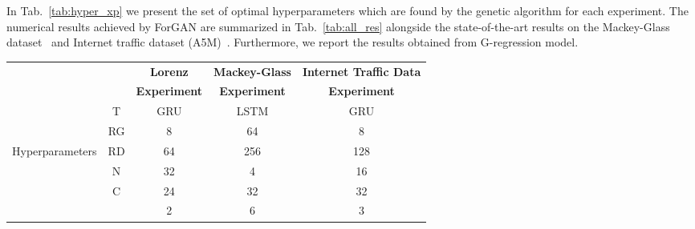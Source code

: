 \documentclass{ieeeaccess}
\begin{document}
In Tab.~\ref{tab:hyper_xp} we present the set of optimal hyperparameters which are found by the genetic algorithm for each experiment. The numerical results achieved by ForGAN are summarized in Tab.~\ref{tab:all_res} alongside the state-of-the-art results on the Mackey-Glass dataset~\cite{mendez2017competitive} and Internet traffic dataset (A5M)~\cite{cortez2012multi}. Furthermore, we report the results obtained from G-regression model.
\begin{table*}
	\centering
	\caption{The optimal hyperparameters used to construct ForGAN for different experiments.}
	\begin{tabular}{c|cccc}
		\toprule
		\multicolumn{2}{c}{ } & \textbf{Lorenz} & \textbf{Mackey-Glass} & \textbf{Internet Traffic Data} \\
		\multicolumn{2}{c}{ } & \textbf{Experiment} & \textbf{Experiment} & \textbf{Experiment} \\
		\midrule
		& T  & GRU & LSTM & GRU \\
		&RG & 8 & 64 & 8 \\
		Hyperparameters  &RD & 64 & 256 & 128 \\
		& N & 32 & 4 & 16 \\
		& C & 24 & 32 & 32 \\
		&  & 2 & 6 & 3 \\
		\bottomrule
	\end{tabular}

	\label{tab:hyper_xp}
\end{table*}
\end{document}

